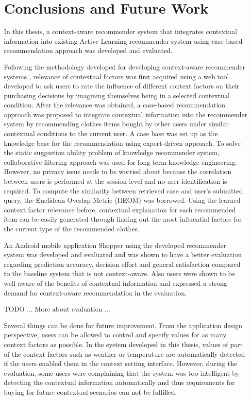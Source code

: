 \chapter{Conclusions and Future Work}\label{chapter:conclusions}

In this thesis, a context-aware recommender system that integrates contextual information into existing Active Learning recommender system using case-based recommendation approach was developed and evaluated.

Following the methodology developed for developing context-aware recommender systems \cite{ref:5}, relevance of contextual factors was first acquired using a web tool developed to ask users to rate the influence of different context factors on their purchasing decisions by imagining themselves being in a selected contextual condition. After the relevance was obtained, a case-based recommendation approach was proposed to integrate contextual information into the recommender system by recommending clothes items bought by other users under similar contextual conditions to the current user. A case base was set up as the knowledge base for the recommendation using expert-driven approach. To solve the static suggestion ability problem of knowledge recommender system, collaborative filtering approach was used for long-term knowledge engineering. However, no privacy issue needs to be worried about because the correlation between users is performed at the session level and no user identification is required. To compute the similarity between retrieved case and user's submitted query, the Euclidean Overlap Metric (HEOM) was borrowed. Using the learned context factor relevance before, contextual explanation for each recommended item can be easily generated through finding out the most influential factors for the current type of the recommended clothes.

An Android mobile application Shopper using the developed recommender system was developed and evaluated and was shown to have a better evaluation regarding prediction accuracy, decision effort and general satisfaction compared to the baseline system that is not context-aware. Also users were shown to be well aware of the benefits of contextual information and expressed a strong demand for context-aware recommendation in the evaluation. 

TODO ... More about evaluation ...

Several things can be done for future improvement. From the application design perspective, users can be allowed to control and specify values for as many context factors as possible. In the system developed in this thesis, values of part of the context factors such as weather or temperature are automatically detected if the users enabled them in the context setting interface. However, during the evaluation, some users were complaining that the system was too intelligent by detecting the contextual information automatically and thus requirements for buying for future contextual scenarios can not be fulfilled. 

